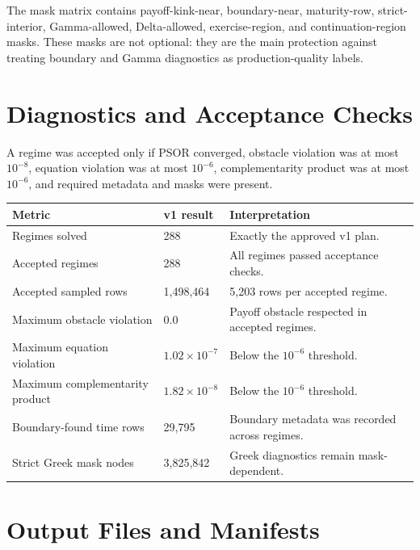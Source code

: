 \documentclass[11pt,a4paper]{article}
\begin{document}
The mask matrix contains payoff-kink-near, boundary-near, maturity-row, strict-interior,
Gamma-allowed, Delta-allowed, exercise-region, and continuation-region masks. These masks are
not optional: they are the main protection against treating boundary and Gamma diagnostics as
production-quality labels.

\section{Diagnostics and Acceptance Checks}

A regime was accepted only if PSOR converged, obstacle violation was at most \(10^{-8}\), equation
violation was at most \(10^{-6}\), complementarity product was at most \(10^{-6}\), and required
metadata and masks were present.

\begin{longtable}{L{0.38\textwidth} L{0.24\textwidth} L{0.28\textwidth}}
\toprule
Metric & v1 result & Interpretation \\
\midrule
\endhead
Regimes solved & 288 & Exactly the approved v1 plan. \\
Accepted regimes & 288 & All regimes passed acceptance checks. \\
Accepted sampled rows & 1,498,464 & 5,203 rows per accepted regime. \\
Maximum obstacle violation & \(0.0\) & Payoff obstacle respected in accepted regimes. \\
Maximum equation violation & \(1.02\times 10^{-7}\) & Below the \(10^{-6}\) threshold. \\
Maximum complementarity product & \(1.82\times 10^{-8}\) & Below the \(10^{-6}\) threshold. \\
Boundary-found time rows & 29,795 & Boundary metadata was recorded across regimes. \\
Strict Greek mask nodes & 3,825,842 & Greek diagnostics remain mask-dependent. \\
\bottomrule
\end{longtable}

\section{Output Files and Manifests}
\end{document}
